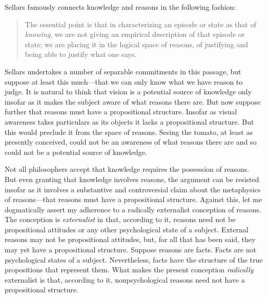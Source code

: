 \documentclass[12pt]{article}
\begin{document}
Sellars famously connects knowledge and reasons in the following fashion:
\begin{quote}
	The essential point is that in characterizing an episode or state as that of \emph{knowing}, we are not giving an empirical description of that episode or state; we are placing it in the logical space of reasons, of justifying and being able to justify what one says.
\end{quote}
Sellars undertakes a number of separable commitments in this passage, but suppose at least this much---that we can only know what we have reason to judge. It is natural to think that vision is a potential source of knowledge only insofar as it makes the subject aware of what reasons there are. But now suppose further that reasons must have a propositional structure. Insofar as visual awareness takes particulars as its objects it lacks a propositional structure. But this would preclude it from the space of reasons. Seeing the tomato, at least as presently conceived, could not be an awareness of what reasons there are and so could not be a potential source of knowledge.

Not all philosophers accept that knowledge requires the possession of reasons. But even granting that knowledge involves reasons, the argument can be resisted insofar as it involves a substantive and controversial claim about the metaphysics of reasons---that reasons must have a propositional structure. Against this, let me dogmatically assert my adherence to a radically externalist conception of reasons. The conception is \emph{externalist} in that, according to it, reasons need not be propositional attitudes or any other psychological state of a subject. External reasons may not be propositional attitudes, but, for all that has been said, they may yet have a propositional structure. Suppose reasons are facts. Facts are not psychological states of a subject. Nevertheless, facts have the structure of the true propositions that represent them. What makes the present conception \emph{radically} externalist is that, according to it, nonpsychological reasons need not have a propositional structure.
\end{document}
